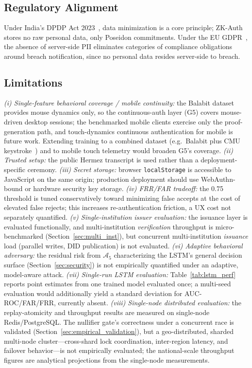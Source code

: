 \documentclass[journal,twoside,10pt]{IEEEtran}
\begin{document}
\subsection{Regulatory Alignment}
Under India's DPDP Act 2023~\cite{dpdp}, data minimization is a core
principle; ZK-Auth stores no raw personal data, only Poseidon commitments.
Under the EU GDPR~\cite{gdpr}, the absence of server-side PII eliminates
categories of compliance obligations around breach notification, since no
personal data resides server-side to breach.

\subsection{Limitations}
\textit{(i) Single-feature behavioral coverage / mobile continuity:} the
Balabit dataset provides mouse dynamics only, so the continuous-auth layer
(G5) covers mouse-driven desktop sessions; the benchmarked mobile clients
exercise only the proof-generation path, and touch-dynamics continuous
authentication for mobile is future work. Extending training to a combined
dataset (e.g.\ Balabit plus CMU keystroke~\cite{killourhy09}) and to mobile
touch telemetry would broaden G5's coverage.
\textit{(ii) Trusted setup:} the public Hermez transcript is used rather
than a deployment-specific ceremony.
\textit{(iii) Secret storage:} browser \texttt{localStorage} is
accessible to JavaScript on the same origin; production deployment should
use WebAuthn-bound or hardware security key storage.
\textit{(iv) FRR/FAR tradeoff:} the 0.75 threshold is tuned conservatively
toward minimizing false accepts at the cost of elevated false rejects;
this increases re-authentication friction, a UX cost not separately
quantified.
\textit{(v) Single-institution issuer evaluation:} the issuance layer is
evaluated functionally, and multi-institution \emph{verification} throughput
is micro-benchmarked (Section~\ref{sec:multi_inst}), but concurrent
multi-institution \emph{issuance} load (parallel writes, DID publication) is
not evaluated.
\textit{(vi) Adaptive behavioral adversary:} the residual risk from
$\mathcal{A}_5$ characterizing the LSTM's general decision surface
(Section~\ref{sec:security}) is not empirically quantified under an
adaptive, model-aware attack.
\textit{(vii) Single-run LSTM evaluation:} Table~\ref{tab:lstm_perf}
reports point estimates from one trained model evaluated once; a
multi-seed evaluation would additionally yield a standard deviation for
AUC-ROC/FAR/FRR, currently absent.
\textit{(viii) Single-node distributed evaluation:} the replay-atomicity
and throughput results are measured on single-node Redis/PostgreSQL. The
nullifier gate's correctness under a concurrent race is validated
(Section~\ref{sec:empirical_validation}), but a geo-distributed, sharded
multi-node cluster---cross-shard lock coordination, inter-region latency,
and failover behavior---is not empirically evaluated; the national-scale
throughput figures are analytical projections from the single-node
measurements.
\end{document}

